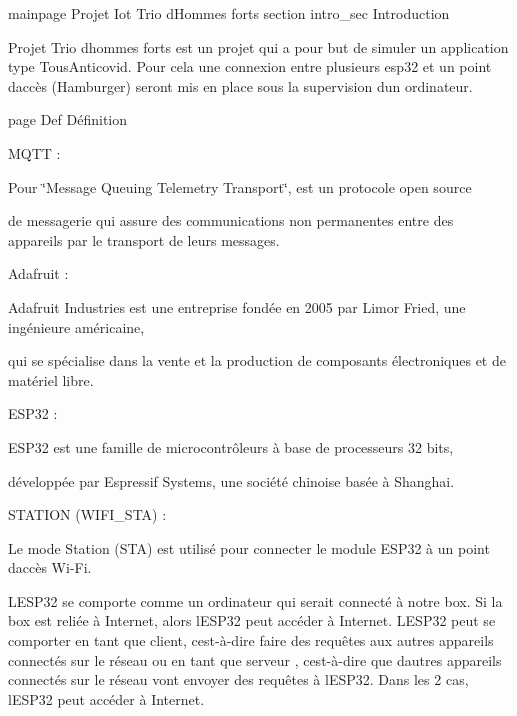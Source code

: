 \label{index_md_mainpage}%
%
mainpage Projet Iot Trio d\textquotesingle{}Hommes forts section intro\+\_\+sec Introduction
\begin{DoxyItemize}
\item Projet Trio d\textquotesingle{}hommes forts est un projet qui a pour but de simuler un application type Tous\+Anticovid. Pour cela une connexion entre plusieurs esp32 et un point d\textquotesingle{}accès (Hamburger) seront mis en place sous la supervision d\textquotesingle{}un ordinateur.
\end{DoxyItemize}

page Def Définition

MQTT \+:
\begin{DoxyItemize}
\item Pour \char`\"{}\+Message Queuing Telemetry Transport\char`\"{}, est un protocole open source
\item de messagerie qui assure des communications non permanentes entre des appareils par le transport de leurs messages.
\end{DoxyItemize}

Adafruit \+:
\begin{DoxyItemize}
\item Adafruit Industries est une entreprise fondée en 2005 par Limor Fried, une ingénieure américaine,
\item qui se spécialise dans la vente et la production de composants électroniques et de matériel libre. ~\newline

\end{DoxyItemize}

ESP32 \+:
\begin{DoxyItemize}
\item ESP32 est une famille de microcontrôleurs à base de processeurs 32 bits,
\item développée par Espressif Systems, une société chinoise basée à Shanghai.
\end{DoxyItemize}

STATION (WIFI\+\_\+\+STA) \+:
\begin{DoxyItemize}
\item Le mode Station (STA) est utilisé pour connecter le module ESP32 à un point d\textquotesingle{}accès Wi-\/\+Fi.
\item L\textquotesingle{}ESP32 se comporte comme un ordinateur qui serait connecté à notre box. Si la box est reliée à Internet, alors l\textquotesingle{}ESP32 peut accéder à Internet. L\textquotesingle{}ESP32 peut se comporter en tant que client, c\textquotesingle{}est-\/à-\/dire faire des requêtes aux autres appareils connectés sur le réseau ou en tant que serveur , c\textquotesingle{}est-\/à-\/dire que d\textquotesingle{}autres appareils connectés sur le réseau vont envoyer des requêtes à l\textquotesingle{}ESP32. Dans les 2 cas, l\textquotesingle{}ESP32 peut accéder à Internet.
\end{DoxyItemize}

